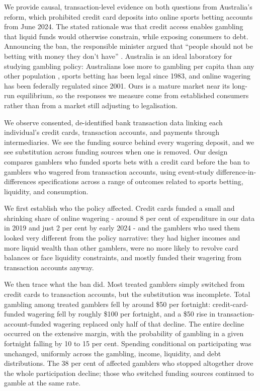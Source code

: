 \documentclass[11pt]{article}
\begin{document}
We provide causal, transaction-level evidence on both questions from Australia's reform, which prohibited credit card deposits into online sports betting accounts from June 2024. The stated rationale was that credit access enables gambling that liquid funds would otherwise constrain, while exposing consumers to debt. Announcing the ban, the responsible minister argued that ``people should not be betting with money they don't have'' \citep{Rowland_credit_cards_ban_2024}. Australia is an ideal laboratory for studying gambling policy: Australians lose more to gambling per capita than any other population \citep{Peake2025_biggest_losers}, sports betting has been legal since 1983, and online wagering has been federally regulated since 2001. Ours is a mature market near its long-run equilibrium, so the responses we measure come from established consumers rather than from a market still adjusting to legalisation.

We observe consented, de-identified bank transaction data linking each individual's credit cards, transaction accounts, and payments through intermediaries. We see the funding source behind every wagering deposit, and we see substitution across funding sources when one is removed. Our design compares gamblers who funded sports bets with a credit card before the ban to gamblers who wagered from transaction accounts, using event-study difference-in-differences specifications across a range of outcomes related to sports betting, liquidity, and consumption.

We first establish who the policy affected. Credit cards funded a small and shrinking share of online wagering - around 8 per cent of expenditure in our data in 2019 and just 2 per cent by early 2024 - and the gamblers who used them looked very different from the policy narrative: they had higher incomes and more liquid wealth than other gamblers, were no more likely to revolve card balances or face liquidity constraints, and mostly funded their wagering from transaction accounts anyway.

We then trace what the ban did. Most treated gamblers simply switched from credit cards to transaction accounts, but the substitution was incomplete. Total gambling among treated gamblers fell by around \$50 per fortnight: credit-card-funded wagering fell by roughly \$100 per fortnight, and a \$50 rise in transaction-account-funded wagering replaced only half of that decline. The entire decline occurred on the extensive margin, with the probability of gambling in a given fortnight falling by 10 to 15 per cent. Spending conditional on participating was unchanged, uniformly across the gambling, income, liquidity, and debt distributions. The 38 per cent of affected gamblers who stopped altogether drove the whole participation decline; those who switched funding sources continued to gamble at the same rate.
\end{document}
